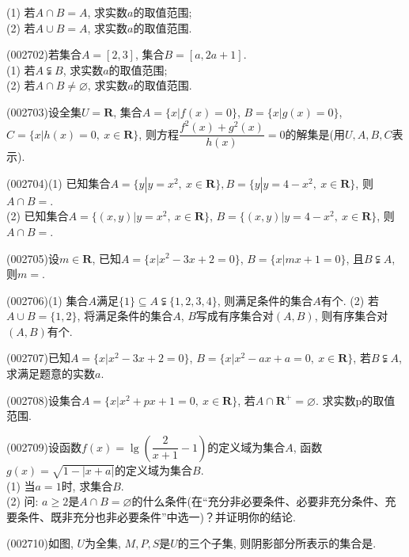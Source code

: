 (1) 若$A\cap B=A$, 求实数$a$的取值范围;\\
(2) 若$A\cup B=A$, 求实数$a$的取值范围.
\item (002702)若集合$A=[2,3]$, 集合$B=[a,2a+1]$.\\
(1) 若$A\subsetneqq B$, 求实数$a$的取值范围;\\
(2) 若$A\cap B\ne \varnothing$, 求实数$a$的取值范围.
\item (002703)设全集$U=\mathbf{R}$, 集合$A=\{x|f(x)=0\}$, $B=\{x|g(x)=0\}$, $C=\{x|h(x)=0, \ x\in \mathbf{R}\}$, 则方程$\dfrac{f^2(x)+g^2(x)}{h(x)}=0$的解集是(用$U,A,B,C$表示).
\item (002704)(1) 已知集合$A=\{y|y=x^2, \ x\in \mathbf{R}\}, B=\{y|y=4-x^2, \ x\in \mathbf{R}\}$, 则$A\cap B=$.\\
(2) 已知集合$A=\{(x,y)|y={x^2},\ x\in \mathbf{R}\}$, $B=\{(x,y)|y=4-x^2, \ x\in \mathbf{R}\}$, 则$A\cap B=$.
\item (002705)设$m\in \mathbf{R}$, 已知$A=\{x|x^2-3x+2=0\}$, $B=\{x|mx+1=0\}$, 且$B\subsetneqq A$, 则$m=$.
\item (002706)(1) 集合$A$满足$\{1\}\subseteq A \subsetneqq \{1,2,3,4\}$, 则满足条件的集合$A$有个.
(2) 若$A\cup B=\{1,2\}$, 将满足条件的集合$A$, $B$写成有序集合对$(A,B)$, 则有序集合对$(A,B)$有个.
\item (002707)已知$A=\{x|x^2-3x+2=0\}$, $B=\{x|x^2-ax+a=0, \ x\in \mathbf{R}\}$, 若$B\subsetneqq A$, 求满足题意的实数$a$.
\item (002708)设集合$A=\{x|x^2+px+1=0,\ x\in \mathbf{R}\}$, 若$A\cap \mathbf{R}^+=\varnothing$. 求实数p的取值范围.
\item (002709)设函数$f(x)=\lg (\dfrac2{x+1}-1)$的定义域为集合$A$, 函数$g(x)=\sqrt{1-|x+a|}$的定义域为集合$B$.\\
(1) 当$a=1$时, 求集合$B$.\\
(2) 问: $a\ge 2$是$A\cap B=\varnothing$的什么条件(在``充分非必要条件、必要非充分条件、充要条件、既非充分也非必要条件''中选一)？并证明你的结论.
\item (002710)如图, $U$为全集, $M,P,S$是$U$的三个子集, 则阴影部分所表示的集合是.
\begin{center}
\end{center}
